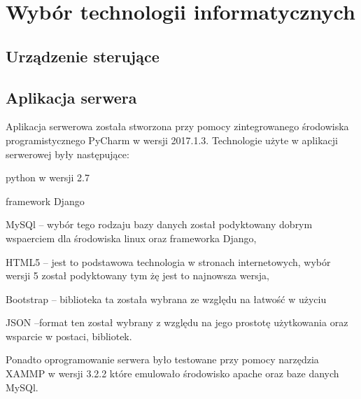 \newpage\section{Wybór technologii informatycznych} \label{sec:technologie}
\subsection{Urządzenie sterujące}

\newpage
\subsection{Aplikacja serwera}
Aplikacja serwerowa została stworzona przy pomocy zintegrowanego środowiska programistycznego PyCharm w wersji 2017.1.3. Technologie użyte w aplikacji serwerowej były następujące:
\begin{itemize*}
	\item python w wersji 2.7
	\item framework Django
	\item MySQl -- wybór tego rodzaju bazy danych został podyktowany dobrym wspaerciem dla środowiska linux oraz frameworka Django,
	\item HTML5 -- jest to podstawowa technologia w stronach internetowych, wybór wersji 5 został podyktowany tym żę jest to najnowsza wersja,
	\item Bootstrap -- biblioteka ta została wybrana ze względu na łatwość w użyciu
	\item JSON --format ten  został wybrany z względu na jego prostotę użytkowania oraz wsparcie w postaci, bibliotek.
\end{itemize*}
Ponadto oprogramowanie serwera było testowane przy pomocy narzędzia XAMMP w wersji 3.2.2 które emulowało środowisko apache oraz baze danych MySQl.

\newpage
